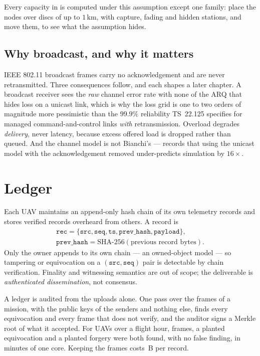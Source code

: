 Every capacity in  is computed under this assumption except one family:
 place the nodes over discs of up to $1$\,km, with capture,
fading and hidden stations, and move them, to see what the assumption hides.

\subsection{Why broadcast, and why it matters}

IEEE 802.11 broadcast frames carry no acknowledgement and are never retransmitted. Three
consequences follow, and each shapes a later chapter. A broadcast receiver sees the \emph{raw}
channel error rate with none of the ARQ that hides loss on a unicast link, which is why the loss
grid is one to two orders of magnitude more pessimistic than the $99.9\%$ reliability TS~22.125
specifies for managed command-and-control links \emph{with} retransmission. Overload degrades
\emph{delivery}, never latency, because excess offered load is dropped rather than queued. And the
channel model is not Bianchi's ---  records that using the unicast model with
the acknowledgement removed under-predicts simulation by $16\times$.

\section{Ledger}

Each UAV maintains an append-only hash chain of its own telemetry records and stores verified
records overheard from others. A record is
\begin{gather*}
\texttt{rec} = \{\texttt{src}, \texttt{seq}, \texttt{ts}, \texttt{prev\_hash}, \texttt{payload}\}, \\
\texttt{prev\_hash} = \mathrm{SHA\text{-}256}(\text{previous record bytes}).
\end{gather*}
Only the owner appends to its own chain --- an owned-object model --- so tampering or equivocation
on a $(\texttt{src}, \texttt{seq})$ pair is detectable by chain verification. Finality and
witnessing semantics are out of scope; the deliverable is \emph{authenticated dissemination}, not
consensus.

A ledger is audited from the uploads alone. One pass over the frames of a mission, with the
public keys of the senders and nothing else, finds every equivocation and every frame that does
not verify, and the auditor signs a Merkle root of what it accepted. For \auUavs{} UAVs over a
flight hour, \auFrames{} frames, a planted equivocation and a planted forgery were both found,
with no false finding, in \auMinutes{} minutes of one core. Keeping the frames costs \auKept\,B
per record.

